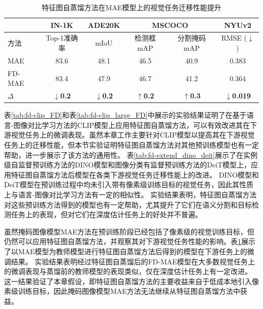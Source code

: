 \begin{table}
        \centering
    \caption{
特征图自蒸馏方法在MAE模型上的视觉任务迁移性能提升
}
        \begin{tabular}{lccccc}
            \toprule
               & IN-1K & ADE20K & \multicolumn{2}{c}{MSCOCO} & NYUv2 \\
               \midrule
              方法 &  Top-1准确率   &  mIoU  & 检测框mAP & 分割掩码mAP & RMSE\scriptsize{ ($\downarrow$)}\\
              \midrule
              MAE & 83.6 & 48.1 & 46.5 & 40.9 & 0.383 \\
              FD-MAE & 83.4 & 47.9 & 46.7 & 41.2 & 0.364 \\
              $\Delta$ & \textbf{$\downarrow$0.2} & \textbf{$\downarrow$0.2} & \textbf{$\uparrow$0.2} & \textbf{$\uparrow$0.3} & \textbf{$\downarrow$0.019} \\
            \bottomrule
        \end{tabular}
        \label{tab:fd-extend_mae}
\end{table}

表\ref{tab:fd-clip_FD}和表\ref{tab:fd-clip_large_FD}中展示的实验结果证明了在基于语言-图像对比学习方法的CLIP模型上应用特征图自蒸馏方法，可以有效改进其在下游视觉任务上的微调表现。虽然本章工作主要针对CLIP模型以提高其在下游视觉任务上的迁移性能，但本节实验证明特征图自蒸馏方法对其他预训练模型也有一定帮助，进一步展示了该方法的通用性。
表\ref{tab:fd-extend_dino_deit}展示了在实例级自监督预训练方法的DINO模型\cite{dino}和图像分类有监督预训练方法的DeiT模型\cite{deit}上，应用特征图自蒸馏方法后模型在各类下游视觉任务迁移性能上的改进。
DINO模型和DeiT模型在预训练过程中均未引入带有像素级训练目标的视觉任务，因此其性质上与语言-图像对比学习方法有一定的相似性。
实验结果表明，特征图自蒸馏方法对这些预训练方法得到的模型也有一定帮助，尤其提升了它们在语义分割和目标检测任务上的表现，但对它们在深度估计任务上的好处并不普遍。

虽然掩码图像模型MAE方法在预训练阶段已经包括了像素级的视觉训练目标，但仍然可以应用特征图自蒸馏方法，并观察其对下游视觉任务性能的影响。表\ref{tab:fd-extend_mae}展示了以MAE模型为教师模型进行特征图自蒸馏方法后得到的模型在下游任务上的微调结果。
实验结果表明经过特征图自蒸馏后的FD-MAE模型在大多数视觉任务上的微调表现与蒸馏前的教师模型的表现类似，仅在深度估计任务上有一定改进。%
这一结果验证了本章假设，即特征图自蒸馏方法的主要收益来自于低成本地引入像素级训练目标，因此掩码图像模型MAE方法无法继续从特征图自蒸馏方法中获益。

